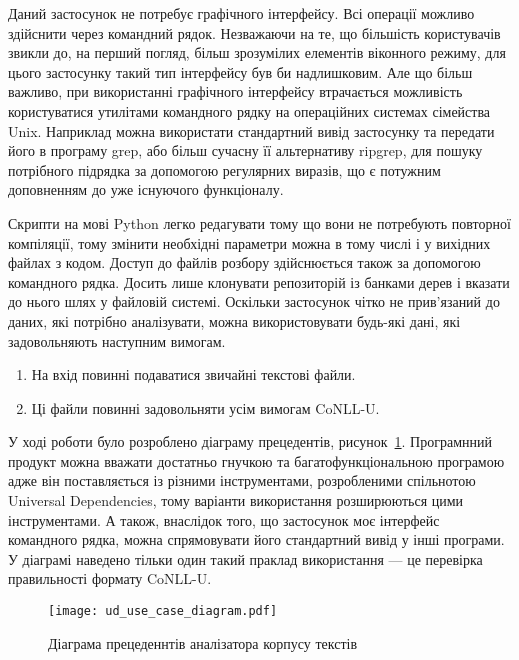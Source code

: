 Даний застосунок не потребує графічного інтерфейсу.
Всі операції можливо здійснити через командний рядок.
Незважаючи на те, що більшість користувачів звикли до, на перший погляд,
більш зрозумілих елементів
віконного режиму, для цього застосунку такий тип інтерфейсу був би надлишковим.
Але що більш важливо, при використанні графічного інтерфейсу втрачається можливість користуватися утилітами командного рядку на операційних
системах сімейства Unix. Наприклад можна використати стандартний
вивід застосунку та передати його в програму grep, або більш сучасну її
альтернативу ripgrep, для пошуку потрібного підрядка за допомогою
регулярних виразів, що є потужним доповненням до уже існуючого
функціоналу.

Скрипти на мові Python легко редагувати тому що вони не
потребують повторної компіляції, тому змінити необхідні параметри можна в тому
числі і у вихідних файлах з кодом. Доступ до файлів розбору здійснюється
також за допомогою командного рядка. Досить лише клонувати репозиторій із
банками дерев і вказати до нього шлях у файловій системі. Оскільки застосунок
чітко не прив'язаний до даних, які потрібно аналізувати, можна використовувати будь-які
дані, які задовольняють наступним вимогам.

\begin{enumerate}
    \item На вхід повинні подаватися звичайні текстові файли.
    \item Ці файли повинні задовольняти усім вимогам CoNLL-U.
\end{enumerate}

У ході роботи було розроблено діаграму прецедентів, рисунок~\ref{img:use_case_diagram}. Програмнний продукт можна вважати достатньо
гнучкою та багатофункціональною програмою адже він поставляється із різними
інструментами, розробленими спільнотою Universal Dependencies, тому
варіанти використання розширюються цими інструментами. А також, внаслідок
того, що застосунок моє інтерфейс командного рядка, можна спрямовувати його
стандартний вивід у інші програми.
У діаграмі наведено
тільки один такий праклад використання --- це перевірка правильності формату
CoNLL-U.

\begin{figure}[ht]
  \begin{center}
    \texttt{[image: ud\_use\_case\_diagram.pdf]}
  \end{center}
  \caption{Діаграма прецеденнтів аналізатора корпусу текстів}
  \label{img:use_case_diagram}
\end{figure}

